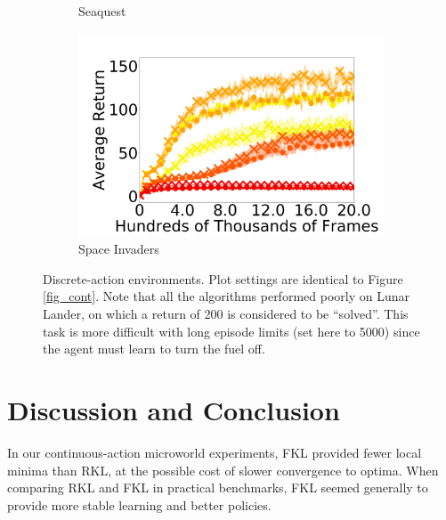 \documentclass[twoside,11pt]{article}
\begin{document}
\begin{figure}[t]
\begin{subfigure}[b]{0.25\linewidth}
    \caption{Seaquest
    }\label{fig:seaquest}
  \end{subfigure}%
  \begin{subfigure}[b]{0.25\linewidth}
    \centering
    \includegraphics[width=\columnwidth]{figs/deep/discrete/UNLABELED_space_invaders_all_kl.png} 
    \caption{Space Invaders
    }\label{fig:space-invaders}
  \end{subfigure}
  \caption{Discrete-action environments. Plot settings are identical to Figure \ref{fig_cont}. Note that all the algorithms performed poorly on Lunar Lander, on which a return of 200 is considered to be ``solved''. This task is more difficult with long episode limits (set here to 5000) since the agent must learn to turn the fuel off. }\label{fig_discrete}
\end{figure}






\section{Discussion and Conclusion} 

%
In our continuous-action microworld experiments, FKL provided fewer local minima than RKL, at the possible cost of slower convergence to optima. When comparing RKL and FKL in practical benchmarks, FKL seemed generally to provide more stable learning and better policies.
\end{document}
